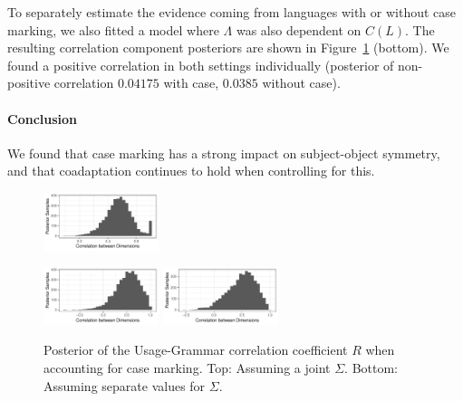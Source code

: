 \documentclass[11pt,a4paper]{article}
\begin{document}
To separately estimate the evidence coming from languages with or without case marking, we also fitted a model where $\Lambda$ was also dependent on $C(L)$.
The resulting correlation component posteriors are shown in Figure~\ref{fig:posterior-case} (bottom).
We found a positive correlation in both settings individually (posterior of non-positive correlation $0.04175$ with case, $0.0385$ without case).

\paragraph{Conclusion}
We found that case marking has a strong impact on subject-object symmetry, and that coadaptation continues to hold when controlling for this.

\begin{figure}
    \centering
    \includegraphics[width=0.3\textwidth]{../change/visualize/figures/corr_ornuhl-binom_42.pdf}
    
    \includegraphics[width=0.3\textwidth]{../change/visualize/figures/corr_ornuhl-binom_45_Case.pdf}
    \includegraphics[width=0.3\textwidth]{../change/visualize/figures/corr_ornuhl-binom_45_NoCase.pdf}
    \caption{Posterior of the Usage-Grammar correlation coefficient $R$ when accounting for case marking. Top: Assuming a joint $\Sigma$. Bottom: Assuming separate values for $\Sigma$.}
    \label{fig:posterior-case}
\end{figure}
\end{document}
